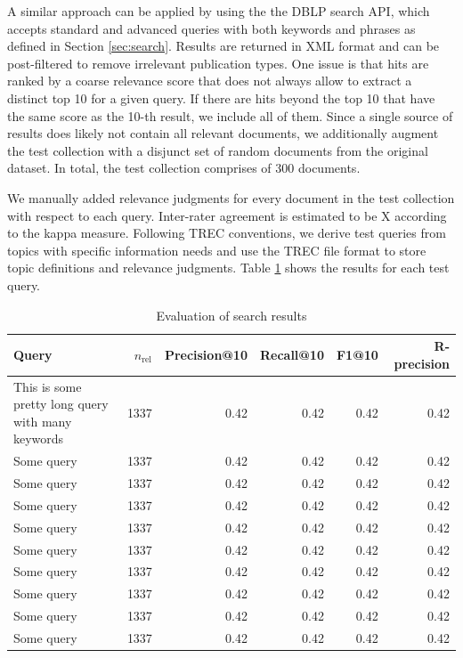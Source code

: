 \documentclass{sig-alternate-05-2015}
\begin{document}
A similar approach can be applied by using the the DBLP search API, which accepts standard and advanced queries with both keywords and phrases as defined in Section \ref{sec:search}. Results are returned in XML format and can be post-filtered to remove irrelevant publication types. One issue is that hits are ranked by a coarse relevance score that does not always allow to extract a distinct top 10 for a given query. If there are hits beyond the top 10 that have the same score as the 10-th result, we include all of them. Since a single source of results does likely not contain all relevant documents, we additionally augment the test collection with a disjunct set of random documents from the original dataset. In total, the test collection comprises of 300 documents.

We manually added relevance judgments for every document in the test collection with respect to each query. Inter-rater agreement is estimated to be X according to the kappa measure. Following TREC conventions, we derive test queries from topics with specific information needs and use the TREC file format to store topic definitions and relevance judgments. Table \ref{tbl:evalsearch} shows the results for each test query.

\begin{table}[th]
\centering
\caption{Evaluation of search results} \label{tbl:evalsearch}
\begin{tabular}{lrrrrr}
Query & $n_\text{rel}$ & Precision@10 & Recall@10 & F1@10 & R-precision \\
\hline
This is some pretty long query with many keywords & 1337 & 0.42 & 0.42 & 0.42 & 0.42 \\
Some query & 1337 & 0.42 & 0.42 & 0.42 & 0.42 \\
Some query & 1337 & 0.42 & 0.42 & 0.42 & 0.42 \\
Some query & 1337 & 0.42 & 0.42 & 0.42 & 0.42 \\
Some query & 1337 & 0.42 & 0.42 & 0.42 & 0.42 \\
Some query & 1337 & 0.42 & 0.42 & 0.42 & 0.42 \\
Some query & 1337 & 0.42 & 0.42 & 0.42 & 0.42 \\
Some query & 1337 & 0.42 & 0.42 & 0.42 & 0.42 \\
Some query & 1337 & 0.42 & 0.42 & 0.42 & 0.42 \\
Some query & 1337 & 0.42 & 0.42 & 0.42 & 0.42 \\
\end{tabular}
\end{table}
\end{document}
